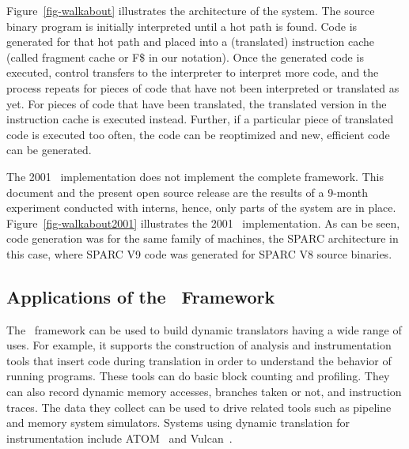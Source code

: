 
Figure~\ref{fig-walkabout} illustrates the architecture of the system. 
The source binary program is initially interpreted until a hot path 
is found.  Code is generated for that hot path and placed into a 
(translated) instruction cache (called fragment cache or F\$ in our 
notation).  Once the generated code is executed, control transfers to 
the interpreter to interpret more code, and the process repeats for pieces 
of code that have not been interpreted or translated as yet.  
For pieces of code that have been translated, the translated version in 
the instruction cache is executed instead. Further, if a particular 
piece of translated code is executed too often, the code can be 
reoptimized and new, efficient code can be generated. 


The 2001 \walk\ implementation does not implement the complete 
framework.  This document and the present open source release are
the results of a 9-month experiment conducted with interns, 
hence, only parts of the system are in place.  
Figure~\ref{fig-walkabout2001} illustrates the 2001 \walk\ implementation. 
As can be seen, code generation was for the same family of machines,
the SPARC architecture in this case, where SPARC V9 code was generated 
for SPARC V8 source binaries.  


\subsection*{Applications of the \walk\ Framework}

The \walk\ framework can be used to build dynamic translators
having a wide range of uses.
For example, it supports the construction of
analysis and instrumentation tools
that insert code during translation
in order to understand the behavior of running programs.
These tools can do basic block counting and profiling.
They can also record dynamic memory accesses,
branches taken or not, and instruction traces.
The data they collect can be used to drive related tools
such as pipeline and memory system simulators.
Systems using dynamic translation for instrumentation include
ATOM~\cite{Sriv94b} and Vulcan~\cite{Sriv01}.

